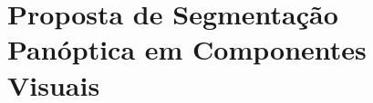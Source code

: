 \newpage
\clearpage
\section{Proposta de Segmentação Panóptica em Componentes Visuais}
\label{proposal:proposal}